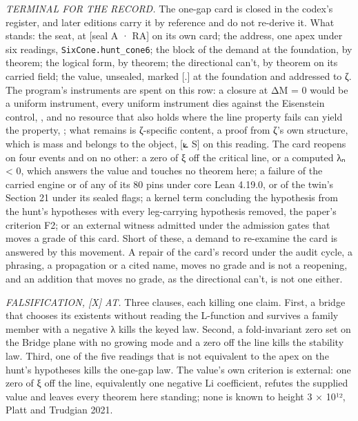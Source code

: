 \documentclass[10pt,twocolumn]{article}
\begin{document}
\emph{TERMINAL FOR THE RECORD.} The one-gap card is closed in the
codex's register, and later editions carry it by reference and do not
re-derive it. What stands: the seat, at {[}seal A · RA{]} on its own
card; the address, one apex under six readings,
\texttt{SixCone.hunt\_cone6}; the block of the demand at the foundation,
by theorem; the logical form, by theorem; the directional can't, by
theorem on its carried field; the value, unsealed, marked {[}.{]} at the
foundation and addressed to ζ. The program's instruments are spent on
this row: a closure at ΔM = 0 would be a uniform instrument, every
uniform instrument dies against the Eisenstein control,
\texttt{}, and no resource that
also holds where the line property fails can yield the property,
\texttt{}; what remains is
ζ-specific content, a proof from ζ's own structure, which is mass and
belongs to the object, {[}⟀ S{]} on this reading. The card reopens on
four events and on no other: a zero of ξ off the critical line, or a
computed λₙ \textless{} 0, which answers the value and touches no
theorem here; a failure of the carried engine or of any of its 80 pins
under core Lean 4.19.0, or of the twin's Section 21 under its sealed
flags; a kernel term concluding the hypothesis from the hunt's
hypotheses with every leg-carrying hypothesis removed, the paper's
criterion F2; or an external witness admitted under the admission gates
that moves a grade of this card. Short of these, a demand to re-examine
the card is answered by this movement. A repair of the card's record
under the audit cycle, a phrasing, a propagation or a cited name, moves
no grade and is not a reopening, and an addition that moves no grade, as
the directional can't, is not one either.

\emph{FALSIFICATION, {[}X{]} AT.} Three clauses, each killing one claim.
First, a bridge that chooses its existents without reading the
L-function and survives a family member with a negative λ kills the
keyed law. Second, a fold-invariant zero set on the Bridge plane with no
growing mode and a zero off the line kills the stability law. Third, one
of the five readings that is not equivalent to the apex on the hunt's
hypotheses kills the one-gap law. The value's own criterion is external:
one zero of ξ off the line, equivalently one negative Li coefficient,
refutes the supplied value and leaves every theorem here standing; none
is known to height 3 × 10¹², Platt and Trudgian 2021.
\end{document}

